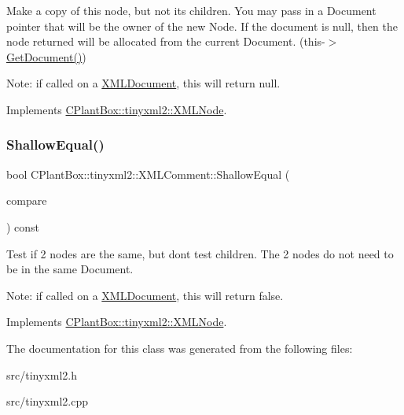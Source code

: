Make a copy of this node, but not its children. You may pass in a Document pointer that will be the owner of the new Node. If the \textquotesingle{}document\textquotesingle{} is null, then the node returned will be allocated from the current Document. (this-\/$>$\hyperlink{classCPlantBox_1_1tinyxml2_1_1XMLNode_ac0d1a9be320497a51e7a202881a2352e}{Get\+Document()})

Note\+: if called on a \hyperlink{classCPlantBox_1_1tinyxml2_1_1XMLDocument}{X\+M\+L\+Document}, this will return null. 

Implements \hyperlink{classCPlantBox_1_1tinyxml2_1_1XMLNode_a8439e4e87206b26bc03427ffac3e882a}{C\+Plant\+Box\+::tinyxml2\+::\+X\+M\+L\+Node}.

\mbox{\label{classCPlantBox_1_1tinyxml2_1_1XMLComment_a8c25248f7f3f3616dba5652b4c239747}} 
\subsubsection{\texorpdfstring{Shallow\+Equal()}{ShallowEqual()}}
{\footnotesize\ttfamily bool C\+Plant\+Box\+::tinyxml2\+::\+X\+M\+L\+Comment\+::\+Shallow\+Equal (\begin{DoxyParamCaption}\item[{const \hyperlink{classCPlantBox_1_1tinyxml2_1_1XMLNode}{X\+M\+L\+Node} $\ast$}]{compare }\end{DoxyParamCaption}) const\hspace{0.3cm}{\ttfamily [virtual]}}

Test if 2 nodes are the same, but don\textquotesingle{}t test children. The 2 nodes do not need to be in the same Document.

Note\+: if called on a \hyperlink{classCPlantBox_1_1tinyxml2_1_1XMLDocument}{X\+M\+L\+Document}, this will return false. 

Implements \hyperlink{classCPlantBox_1_1tinyxml2_1_1XMLNode_a1019a06dab15152f06f3a879bf9a85c9}{C\+Plant\+Box\+::tinyxml2\+::\+X\+M\+L\+Node}.



The documentation for this class was generated from the following files\+:\begin{DoxyCompactItemize}
\item 
src/tinyxml2.\+h\item 
src/tinyxml2.\+cpp\end{DoxyCompactItemize}
